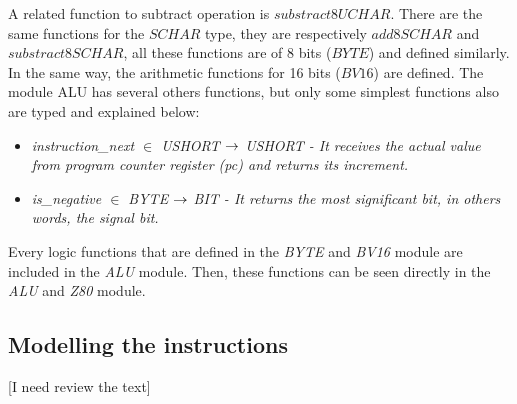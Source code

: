 \documentclass[11pt]{article} %
\begin{document}
\hspace*{0.20in}

A related function to subtract operation is $\mathit{substract8UCHAR}$. There are the same functions for the
$\mathit{SCHAR}$ type, they are respectively $\mathit{add8SCHAR}$ and $\mathit{substract8SCHAR}$, all these
functions are of 8 bits ($\mathit{BYTE}$) and defined similarly. In the same way, the arithmetic functions for 16
bits ($\mathit{BV16}$) are defined.
The module ALU has several others functions, but only some simplest functions also are typed and explained below:

\begin{itemize}

  \item \it instruction\_next  $\in$  USHORT  $\rightarrow$  USHORT \rm - It receives the  
  actual value from program counter register (\textit{pc}) and returns its increment.
 \item \it is\_negative  $\in$  \it BYTE  $\rightarrow$  \it BIT \rm - It returns the most significant bit,
 in others words, the signal bit.

  


\end{itemize}

Every logic functions that are defined in the \textit{BYTE} and \textit{BV16} module are included in the \textit{ALU}
module. Then, these functions can be seen directly in the \textit{ALU} and \textit{Z80} module.

\subsection{Modelling the instructions}[I need review the text]
\end{document}

